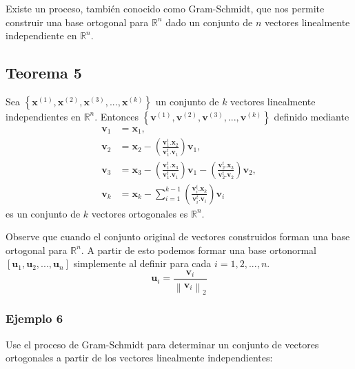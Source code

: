 \documentclass{report}
\numberwithin{subsection}{section} %
\begin{document}
Existe  un proceso, también conocido como Gram-Schmidt, que nos permite construir una base ortogonal para $\mathbb{R}^{n}$ dado un conjunto de $n$ vectores linealmente independiente en $\mathbb{R}^{n}$.

\subsection{\textnormal{Teorema 5}}

Sea $\left\{ \textbf{x}^{\left( 1 \right)}, \textbf{x}^{\left( 2 \right)}, \textbf{x}^{\left( 3 \right)}, ..., \textbf{x}^{\left( k \right)} \right\}$ un conjunto de $k$ vectores linealmente independientes en $\mathbb{R}^{n}$. Entonces $\left\{ \textbf{v}^{\left( 1 \right)}, \textbf{v}^{\left( 2 \right)}, \textbf{v}^{\left( 3 \right)}, ..., \textbf{v}^{\left( k \right)} \right\}$ definido mediante
\begin{align*}
\textbf{v}_{1} &= \textbf{x}_{1}, \\
\textbf{v}_{2} &= \textbf{x}_{2} - \left( \frac{ \textbf{v}_{1}^{t} .\textbf{x}_{2}}{ \textbf{v}_{1}^{t} .\textbf{v}_{1}} \right)\textbf{v}_{1}, \\
\textbf{v}_{3} &= \textbf{x}_{3} - \left( \frac{ \textbf{v}_{1}^{t} .\textbf{x}_{3}}{ \textbf{v}_{1}^{t} .\textbf{v}_{1}} \right)\textbf{v}_{1} - \left( \frac{ \textbf{v}_{2}^{t} .\textbf{x}_{3}}{ \textbf{v}_{2}^{t} .\textbf{v}_{2}} \right)\textbf{v}_{2}, \\
\textbf{v}_{k} &= \textbf{x}_{k} - \sum_{i=1}^{k-1} \left( \frac{ \textbf{v}_{i}^{t} .\textbf{x}_{k}}{ \textbf{v}_{i}^{t} .\textbf{v}_{i}} \right)\textbf{v}_{i}
\end{align*}
es un conjunto de $k$ vectores ortogonales es $\mathbb{R}^{n}$.

Observe que cuando el conjunto original de vectores construidos forman una base ortogonal para $\mathbb{R}^{n}$. A partir de esto podemos formar una base ortonormal $\left[ \textbf{u}_{1}, \textbf{u}_{2}, ... , \textbf{u}_{n} \right]$ simplemente al definir para cada $i = 1, 2, ..., n$.
\begin{equation}
\textbf{u}_{i} = \frac{ \textbf{v}_{i} }{\left\| \textbf{v}_{i} \right\|_{2}}
\end{equation}

\subsubsection*{Ejemplo 6}

    Use el proceso de Gram-Schmidt para determinar un conjunto de vectores ortogonales a partir de los vectores linealmente independientes:
\end{document}
